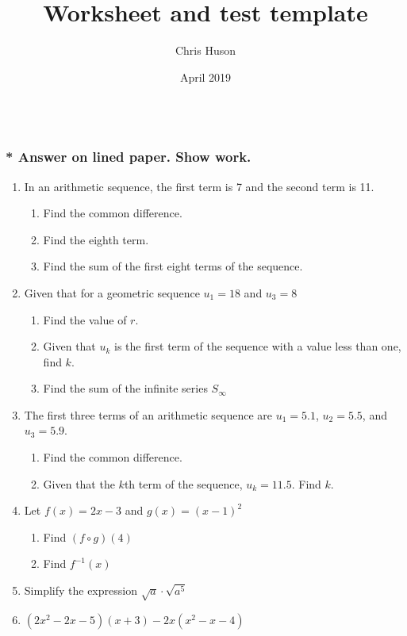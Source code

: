 \documentclass[12pt, oneside]{article}
\title{Worksheet and test template}
\author{Chris Huson}
\date{April 2019}
\begin{document}
\subsubsection*{\\* Answer on lined paper. Show work.}

\begin{enumerate}

\vspace{0.5 cm}

\item In an arithmetic sequence, the first term is 7 and the second term is 11.
\begin{enumerate}
    \item Find the common difference.
    \item Find the eighth term.
    \item Find the sum of the first eight terms of the sequence.
\end{enumerate}

\item Given that for a geometric sequence $u_1=18$ and $u_3=8$
\begin{enumerate}
    \item Find the value of $r$.
    \item Given that $u_k$ is the first term of the sequence with a value less than one, find $k$.
    \item Find the sum of the infinite series $S_\infty$
\end{enumerate}

\item The first three terms of an arithmetic sequence are $u_1=5.1$, $u_2=5.5$, and $u_3=5.9$.
\begin{enumerate}
    \item Find the common difference.
    \item Given that the $k$th term of the sequence, $u_k=11.5$. Find $k$.
\end{enumerate}

\item Let $f(x) = 2x -3$ and $g(x)=(x-1)^2$
\begin{enumerate}
    \item Find $(f \circ g)(4)$
    \item Find $f^{-1}(x)$
\end{enumerate}

\item Simplify the expression $\sqrt{a} \cdot \sqrt{a^5}$

\item $(2x^2-2x-5)(x+3)-2x(x^2-x-4)$


\end{enumerate}
\end{document}

